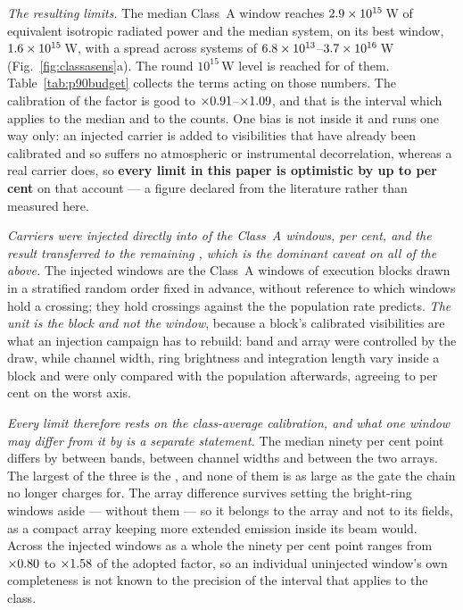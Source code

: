 \emph{The resulting limits.} The median Class~A window reaches
$2.9\times10^{15}$\,W of equivalent isotropic radiated power and the median
system, on its best window, $1.6\times10^{15}$\,W, with a spread across
systems of $6.8\times10^{13}$--$3.7\times10^{16}$\,W
(Fig.~\ref{fig:classasens}a). The round $10^{15}$\,W level is reached for
\NSysEfifteen{} of them. Table~\ref{tab:p90budget} collects the terms acting
on those numbers. The calibration of the factor is good to
$\times0.91$--$\times1.09$, and that is the interval which
applies to the median and to the counts. One bias is not inside it and runs
one way only: an injected carrier is added to visibilities that have already
been calibrated and so suffers no atmospheric or instrumental decorrelation,
whereas a real carrier does, so \textbf{every limit in this paper is
optimistic by up to \SensDecorPct{} per cent} on that account --- a figure
declared from the literature rather than measured here.

\emph{Carriers were injected directly into \SensNInj{} of the \NWinA{}
Class~A windows, \SensNInjPct{} per cent, and the result transferred to the
remaining \SensNTransfer, which is the dominant caveat on all of the above.}
The injected windows are the Class~A windows of execution blocks drawn in a
stratified random order fixed in advance, without reference to which windows
hold a crossing; they hold \SensNCrossAch{} crossings against the
\SensNCrossExp{} the population rate predicts. \emph{The unit is the block
and not the window}, because a block's calibrated visibilities are what an
injection campaign has to rebuild: band and array were controlled by the
draw, while channel width, ring brightness and integration length vary inside
a block and were only compared with the population afterwards, agreeing to
\SensCovWorstPct{} per cent on the worst axis.

\emph{Every limit therefore rests on the class-average calibration, and what
one window may differ from it by is a separate statement.} The median ninety
per cent point differs by \SensBandSpread{} between bands,
\SensChanSpread{} between channel widths and \SensArrSpread{} between the two
arrays. The largest of the three is the \SensCovAxis, and none of them is as
large as the gate the chain no longer charges for. The array difference
survives setting the bright-ring windows aside --- \SensArrSpreadFaint{}
without them --- so it belongs to the array and not to its fields, as a
compact array keeping more extended emission inside its beam would.
Across the injected windows as
a whole the ninety per cent point ranges from $\times0.80$ to
$\times1.58$ of the adopted factor, so an individual uninjected
window's own completeness is not known to the precision of the interval that
applies to the class.

